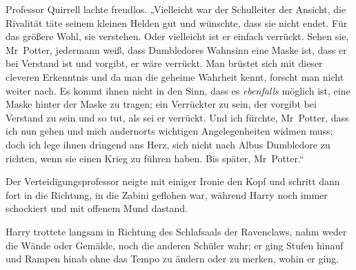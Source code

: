 Professor Quirrell lachte freudlos.
„Vielleicht war der Schulleiter der Ansicht, die Rivalität täte seinem kleinen Helden gut und wünschte, dass sie nicht endet. Für das größere Wohl, sie verstehen. Oder vielleicht ist er einfach verrückt. Sehen sie, Mr~Potter, jedermann weiß, dass Dumbledores Wahnsinn eine Maske ist, dass er bei Verstand ist und vorgibt, er wäre verrückt. Man brüstet sich mit dieser cleveren Erkenntnis und da man die geheime Wahrheit kennt, forscht man nicht weiter nach. Es kommt ihnen nicht in den Sinn, dass es \emph{ebenfalls} möglich ist, eine Maske hinter der Maske zu tragen; ein Verrückter zu sein, der vorgibt bei Verstand zu sein und so tut, als sei er verrückt. Und ich fürchte, Mr~Potter, dass ich nun gehen und mich andernorts wichtigen Angelegenheiten widmen muss; doch ich lege ihnen dringend ans Herz, sich nicht nach Albus Dumbledore zu richten, wenn sie einen Krieg zu führen haben. Bis später, Mr~Potter.“

Der Verteidigungsprofessor neigte mit einiger Ironie den Kopf und schritt dann fort in die Richtung, in die Zabini geflohen war, während Harry noch immer schockiert und mit offenem Mund dastand.


Harry trottete langsam in Richtung des Schlafsaals der Ravenclaws, nahm weder die Wände oder Gemälde, noch die anderen Schüler wahr; er ging Stufen hinauf und Rampen hinab ohne das Tempo zu ändern oder zu merken, wohin er ging.

